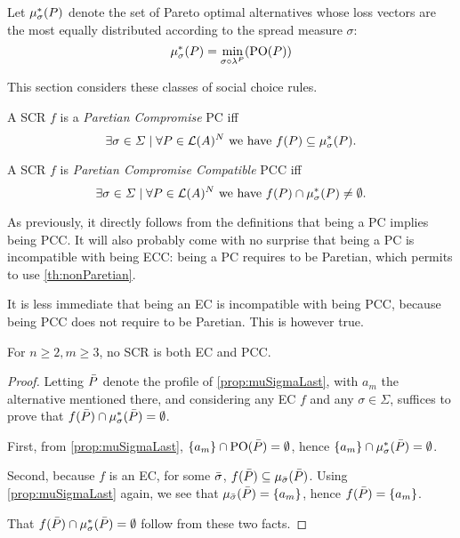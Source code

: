 \documentclass[version=3.21, pagesize, twoside=off, bibliography=totoc, DIV=calc, fontsize=12pt, a4paper]{scrartcl}
\begin{document}
Let $\mu_{\sigma}^*(P)$ denote the set of Pareto optimal alternatives whose loss vectors are the most equally distributed according to the spread measure $\sigma$:
\[\mu_{\sigma}^*(P) = \min_{\sigma \circ \lambda^P} (\text{PO}(P))\]


This section considers these classes of social choice rules.

\begin{definition} A SCR $f$ is a \emph{Paretian Compromise} PC iff \[\exists \sigma \in \Sigma \suchthat \forall P \in \linors^N \text{ we have } f(P) \subseteq \mustar(P).\]
\end{definition}

\begin{definition} A SCR $f$ is \emph{Paretian Compromise Compatible} PCC iff \[\exists \sigma \in \Sigma \suchthat \forall P \in \linors^N \text{ we have } f(P) \cap \mustar(P) \neq \emptyset.\]
\end{definition}

As previously, it directly follows from the definitions that being a PC implies being PCC. 
It will also probably come with no surprise that being a PC is incompatible with being ECC: being a PC requires to be Paretian, which permits to use \cref{th:nonParetian}. 

It is less immediate that being an EC is incompatible with being PCC, because being PCC does not require to be Paretian. This is however true.

\begin{theorem} \label{th:incompatibility} 
	For $n ≥ 2, m ≥ 3$, no SCR is both EC and PCC.
\end{theorem}
\begin{proof}	
	Letting $\bar{P}$ denote the profile of \cref{prop:muSigmaLast}, with $a_m$ the alternative mentioned there, and considering any EC $f$ and any $\sigma \in \Sigma$, suffices to prove that $f(\bar{P}) \cap \mu_{\sigma}^*(\bar{P}) = \emptyset$.
	
	First, from \cref{prop:muSigmaLast}, $\{a_m\} \cap \text{PO}(\bar{P}) = \emptyset$, hence $\{a_m\} \cap \mu_{\sigma}^*(\bar{P}) = \emptyset$.
	
	Second, because $f$ is an EC, for some $\bar{\sigma}$, $f(\bar{P}) \subseteq \mu_{\bar{\sigma}}(\bar{P})$. Using \cref{prop:muSigmaLast} again, we see that $\mu_{\bar{\sigma}}(\bar{P}) = \{a_m\}$, hence $f(\bar{P}) = \{a_m\}$.
	
	That $f(\bar{P}) \cap \mu_{\sigma}^*(\bar{P}) = \emptyset$ follow from these two facts.
\end{proof}
\end{document}
